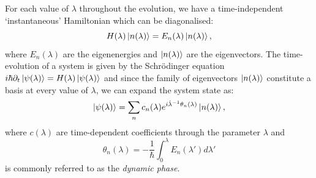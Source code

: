     For each value of $\lambda$ throughout the evolution, we have a time-independent `instantaneous' Hamiltonian which can be diagonalised:
    \begin{equation}\label{eq:instantaneous_schroedinger}
        H(\lambda)\ket{n(\lambda)} = E_n(\lambda)\ket{n(\lambda)},
    \end{equation}
    where $E_n(\lambda)$ are the eigenenergies and $\ket{n(\lambda)}$ are the eigenvectors. The time-evolution of a system is given by the Schr\"{o}dinger equation $i\hbar \partial_t \ket{\psi(\lambda)} = H(\lambda) \ket{\psi(\lambda)}$ and since the family of eigenvectors $\ket{n(\lambda)}$ constitute a basis at every value of $\lambda$, we can expand the system state as:
    \begin{equation}\label{eq:adiabatic_basis_expansion}
        \ket{\psi(\lambda)} = \sum_n c_n(\lambda)e^{i \dot{\lambda}^{-1} \theta_n(\lambda)}\ket{n(\lambda)},
    \end{equation}
    where $c(\lambda)$ are time-dependent coefficients through the parameter $\lambda$ and
    \begin{equation}\label{eq:dynamical_phase}
        \theta_n(\lambda) = -\frac{1}{\hbar} \int_0^{\lambda} E_n(\lambda') d\lambda'
    \end{equation}
    is commonly referred to as the \emph{dynamic phase}. 
    
